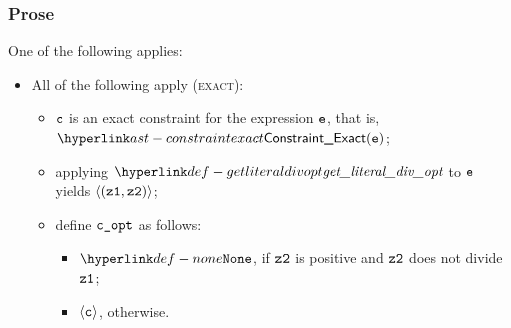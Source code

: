 \subsubsection{Prose}
One of the following applies:
\begin{itemize}
  \item All of the following apply (\textsc{exact}):
  \begin{itemize}
    \item $\texttt{c}$ is an exact constraint for the expression $\texttt{e}$, that is, $\ConstraintExact(\ve)$;
    \item applying $\getliteraldivopt$ to $\texttt{e}$ yields $\langle(\texttt{z1}, \texttt{z2})\rangle$\ProseTerminateAs{\None};
    \item define $\texttt{c\_opt}$ as follows:
    \begin{itemize}
      \item $\None$, if $\texttt{z2}$ is positive and $\texttt{z2}$ does not divide $\texttt{z1}$;
      \item $\langle\texttt{c}\rangle$, otherwise.
    \end{itemize}
  \end{itemize}


\end{itemize}
